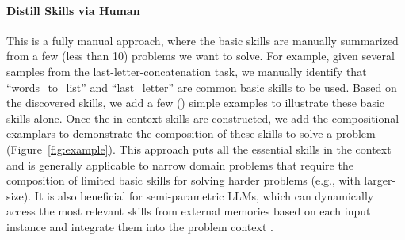 \documentclass{article} \usepackage{arxiv}
\begin{document}
\paragraph{Distill Skills via Human} 
This is a fully manual approach, where the basic skills are manually summarized from a few (less than 10) problems we want to solve. For example, given several samples from the last-letter-concatenation task, we manually identify that ``words\_to\_list'' and ``last\_letter'' are common basic skills to be used. Based on the discovered skills, we add a few () simple examples to illustrate these basic skills alone. Once the in-context skills are constructed, we add the compositional examplars to demonstrate the composition of these skills to solve a problem (Figure~\ref{fig:example}). This approach puts all the essential skills in the context and is generally applicable to narrow domain problems that require the composition of limited basic skills for solving harder problems (e.g., with larger-size). It is also beneficial for semi-parametric LLMs, which can dynamically access the most relevant skills from external memories based on each input instance and integrate them into the problem context \citep{pan2023knowledgeincontext}.
\end{document}
